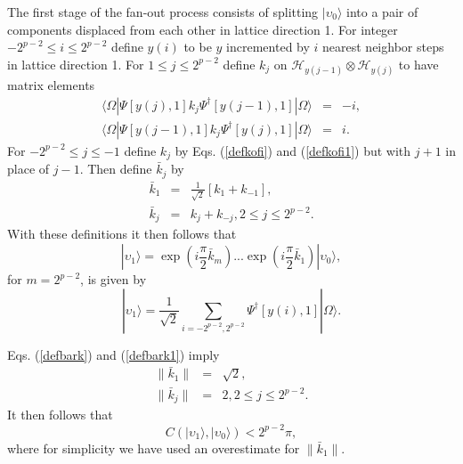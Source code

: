 \documentclass[twocolumn,amsmath,amssymb]{revtex4-1}
\begin{document}
The first stage of the fan-out process consists of
splitting $|\upsilon_0 \rangle $ into a pair of components displaced from
each other in lattice direction 1.
For integer $-2^{p-2} \le i \le 2^{p-2}$ define $y( i)$ to be
$y$ incremented by $i$ nearest neighbor steps
in lattice direction 1. For $1 \le j \le 2^{p-2}$ define
$k_j$ on $\mathcal{H}_{y( j -1)} \otimes \mathcal{H}_{y(j)}$ to have
matrix elements
\begin{subequations}
\begin{eqnarray}
\label{defkofi}
 \langle  \Omega| \Psi[y(j),1] k_j  \Psi^{\dagger}[y(j-1),1]|\Omega \rangle  &=& -i, \\
\label{defkofi1}
 \langle  \Omega| \Psi[y(j-1), 1]  k_j \Psi^{\dagger}[ y(j),1]|\Omega \rangle  &=& i.
\end{eqnarray}
\end{subequations}
For $-2^{p-2} \le j \le -1$ define
$k_j$ by Eqs. (\ref{defkofi}) and (\ref{defkofi1}) but with $j+1$
in place of $j-1$.
Then define $\bar{k}_j$ by
\begin{subequations}
  \begin{eqnarray}
    \label{defbark}
    \bar{k}_1 & = & \frac{1}{\sqrt{2}}[ k_1 + k_{-1}], \\
   \label{defbark1}
   \bar{k}_j & = &  k_j + k_{-j}, 2 \le j \le 2^{p-2}.
  \end{eqnarray}
\end{subequations}
With these definitions it then follows that
\begin{equation}
\label{defupsilon1}
|\upsilon_1 \rangle  = 
\exp(i \frac{\pi}{2}\bar{ k}_m) ... \exp(i \frac{\pi}{2} \bar{ k}_1) |\upsilon_0 \rangle ,
\end{equation}
for $m = 2^{p-2}$,
is given by
\begin{equation}
\label{defupsilon11}
|\upsilon_1 \rangle  = \frac{1}{\sqrt{2}}\sum_{i = -2^{p-2},2^{p-2}}  \Psi^{\dagger}[ y(i), 1] |\Omega \rangle .
\end{equation}

Eqs. (\ref{defbark}) and (\ref{defbark1}) imply
\begin{subequations}
  \begin{eqnarray}
       \label{defbarkn}
   \parallel \bar{k}_1 \parallel & = & \sqrt{2}, \\
   \label{defbark1n}
  \parallel \bar{k}_j\parallel & = &  2, 2 \le j \le 2^{p-2}.
  \end{eqnarray}
\end{subequations}
It then follows that
\begin{equation}
  \label{stageoneb}
  C( |\upsilon_1 \rangle , |\upsilon_0 \rangle ) < 2^{p-2} \pi,
\end{equation}
where for simplicity we have used an overestimate for $\parallel \bar{k}_1 \parallel$.
\end{document}
